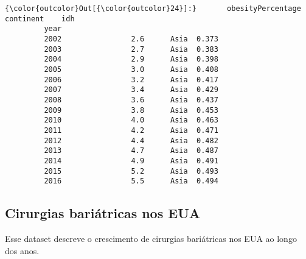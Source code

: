 \documentclass[11pt]{article}
\begin{document}
\begin{Verbatim}[commandchars=\\\{\}]
{\color{outcolor}Out[{\color{outcolor}24}]:}       obesityPercentage continent    idh
         year                                    
         2002                2.6      Asia  0.373
         2003                2.7      Asia  0.383
         2004                2.9      Asia  0.398
         2005                3.0      Asia  0.408
         2006                3.2      Asia  0.417
         2007                3.4      Asia  0.429
         2008                3.6      Asia  0.437
         2009                3.8      Asia  0.453
         2010                4.0      Asia  0.463
         2011                4.2      Asia  0.471
         2012                4.4      Asia  0.482
         2013                4.7      Asia  0.487
         2014                4.9      Asia  0.491
         2015                5.2      Asia  0.493
         2016                5.5      Asia  0.494
\end{Verbatim}
            
    \subsection{Cirurgias bariátricas nos
EUA}\label{cirurgias-bariuxe1tricas-nos-eua}

Esse dataset descreve o crescimento de cirurgias bariátricas nos EUA ao
longo dos anos.
\end{document}
